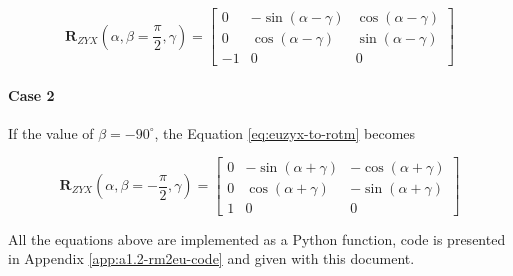 \begin{equation}
    \mathbf{R}_{ZYX} \left ( \alpha, \beta = \frac{\pi}{2}, \gamma \right ) = \begin{bmatrix}
        0 & -\sin(\alpha-\gamma) & \cos(\alpha-\gamma) \\
        0 & \cos(\alpha-\gamma) & \sin(\alpha-\gamma) \\
        -1 & 0 & 0
        \end{bmatrix}
\end{equation}

\paragraph*{Case 2}
If the value of $\beta = -90^{\circ}$, the Equation \ref{eq:euzyx-to-rotm} becomes

\begin{equation}
    \mathbf{R}_{ZYX} \left ( \alpha, \beta = -\frac{\pi}{2}, \gamma \right ) = \begin{bmatrix}
        0 & -\sin(\alpha+\gamma) & -\cos(\alpha+\gamma) \\
        0 & \cos(\alpha+\gamma) & -\sin(\alpha+\gamma) \\
        1 & 0 & 0
        \end{bmatrix}
\end{equation}

\noindent
All the equations above are implemented as a Python function, code is presented in Appendix \ref{app:a1.2-rm2eu-code} and given with this document.
